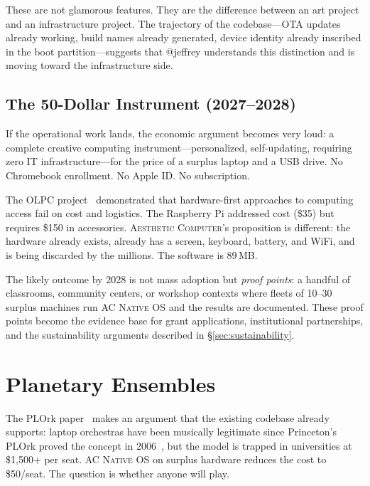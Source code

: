 \documentclass[10pt,letterpaper,twocolumn]{article}
\newcommand{\ac}{\textsc{Aesthetic Computer}}
\newcommand{\acos}{\textsc{AC Native OS}}
\begin{document}
These are not glamorous features. They are the difference between an art project and an infrastructure project. The trajectory of the codebase---OTA updates already working, build names already generated, device identity already inscribed in the boot partition---suggests that @jeffrey understands this distinction and is moving toward the infrastructure side.

\subsection{The 50-Dollar Instrument (2027--2028)}

If the operational work lands, the economic argument becomes very loud: a complete creative computing instrument---personalized, self-updating, requiring zero IT infrastructure---for the price of a surplus laptop and a USB drive. No Chromebook enrollment. No Apple ID. No subscription.

The OLPC project~\citep{kraemer2009olpc} demonstrated that hardware-first approaches to computing access fail on cost and logistics. The Raspberry Pi addressed cost (\$35) but requires \$150 in accessories. \ac{}'s proposition is different: the hardware already exists, already has a screen, keyboard, battery, and WiFi, and is being discarded by the millions. The software is 89\,MB.

The likely outcome by 2028 is not mass adoption but \emph{proof points}: a handful of classrooms, community centers, or workshop contexts where fleets of 10--30 surplus machines run \acos{} and the results are documented. These proof points become the evidence base for grant applications, institutional partnerships, and the sustainability arguments described in \S\ref{sec:sustainability}.


\section{Planetary Ensembles}
\label{sec:ensembles}

The PLOrk paper~\citep{scudder2026plork} makes an argument that the existing codebase already supports: laptop orchestras have been musically legitimate since Princeton's PLOrk proved the concept in 2006~\citep{trueman2006plork}, but the model is trapped in universities at \$1,500+ per seat. \acos{} on surplus hardware reduces the cost to \$50/seat. The question is whether anyone will play.
\end{document}
